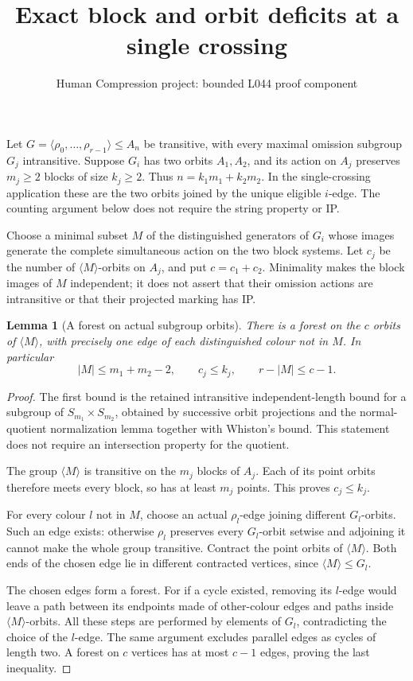 \documentclass[11pt,a4paper]{article}
\title{Exact block and orbit deficits at a single crossing}
\author{Human Compression project: bounded L044 proof component}
\date{}
\newtheorem{lemma}{Lemma}
\newcommand{\gen}[1]{\langle#1\rangle}
\begin{document}
\maketitle
Let $G=\gen{\rho_0,\ldots,\rho_{r-1}}\leq A_n$ be transitive,
with every maximal omission subgroup $G_j$ intransitive. Suppose
$G_i$ has two orbits $A_1,A_2$, and its action on $A_j$ preserves
$m_j\geq2$ blocks of size $k_j\geq2$. Thus
$n=k_1m_1+k_2m_2$. In the single-crossing application these are
the two orbits joined by the unique eligible $i$-edge. The counting
argument below does not require the string property or IP.

Choose a minimal subset $M$ of the distinguished generators of
$G_i$ whose images generate the complete simultaneous action on
the two block systems. Let $c_j$ be the number of $\gen M$-orbits
on $A_j$, and put $c=c_1+c_2$. Minimality makes the block images
of $M$ independent; it does not assert that their omission actions
are intransitive or that their projected marking has IP.

\begin{lemma}[A forest on actual subgroup orbits]\label{forest}
There is a forest on the $c$ orbits of $\gen M$, with precisely
one edge of each distinguished colour not in $M$. In particular
\[
 |M|\leq m_1+m_2-2,\qquad c_j\leq k_j,\qquad
 r-|M|\leq c-1.
\]
\end{lemma}
\begin{proof}
The first bound is the retained intransitive independent-length
bound for a subgroup of $S_{m_1}\times S_{m_2}$, obtained by
successive orbit projections and the normal-quotient normalization
lemma together with Whiston's bound. This statement does not
require an intersection property for the quotient.

The group $\gen M$ is transitive on the $m_j$ blocks of $A_j$.
Each of its point orbits therefore meets every block, so has at
least $m_j$ points. This proves $c_j\leq k_j$.

For every colour $l$ not in $M$, choose an actual $\rho_l$-edge
joining different $G_l$-orbits. Such an edge exists: otherwise
$\rho_l$ preserves every $G_l$-orbit setwise and adjoining it
cannot make the whole group transitive. Contract the point orbits
of $\gen M$. Both ends of the chosen edge lie in different
contracted vertices, since $\gen M\leq G_l$.

The chosen edges form a forest. For if a cycle existed, removing
its $l$-edge would leave a path between its endpoints made of
other-colour edges and paths inside $\gen M$-orbits. All these
steps are performed by elements of $G_l$, contradicting the
choice of the $l$-edge. The same argument excludes parallel edges
as cycles of length two. A forest on $c$ vertices has at most
$c-1$ edges, proving the last inequality.
\end{proof}
\end{document}
